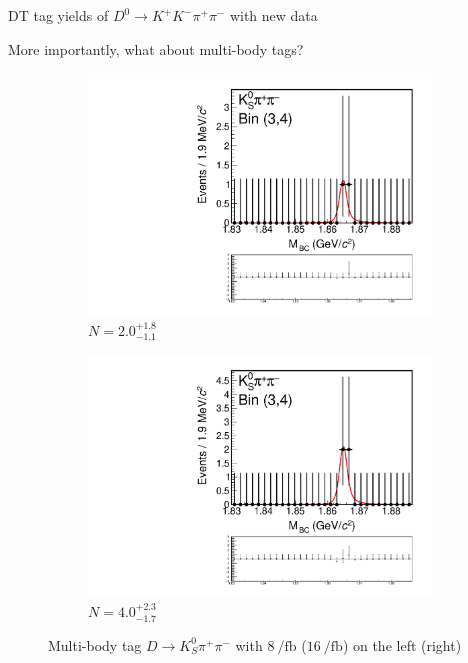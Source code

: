 \documentclass{beamer}
\begin{document}
\begin{frame}{DT tag yields of $D^0\to K^+K^-\pi^+\pi^-$ with new data}
  \begin{center}
    {\large More importantly, what about multi-body tags?}
  \end{center}
  \vspace{0.1cm}
  \begin{figure}
    \centering
    \begin{subfigure}{0.45\textwidth}
      \includegraphics[width = 1.0\textwidth,trim={0 4.9cm 0 0},clip=true]{Plots/DoubleTagYield_DoubleTag_SCMB_KKpipi_vs_KSpipi_SignalBinP3_TagBin4_8invfb.pdf}
      \caption{$N = 2.0^{+1.8}_{-1.1}$}
    \end{subfigure}%
    \hspace{1cm}
    \begin{subfigure}{0.45\textwidth}
      \includegraphics[width = 1.0\textwidth,trim={0 4.9cm 0 0},clip=true]{Plots/DoubleTagYield_DoubleTag_SCMB_KKpipi_vs_KSpipi_SignalBinP3_TagBin4_16invfb.pdf}
      \caption{$N = 4.0^{+2.3}_{-1.7}$}
    \end{subfigure}
    \caption{Multi-body tag $D\to K_S^0\pi^+\pi^-$ with $\SI{8}{\per\femto\barn}$ ($\SI{16}{\per\femto\barn}$) on the left (right)}
  \end{figure}
\end{frame}
\end{document}
